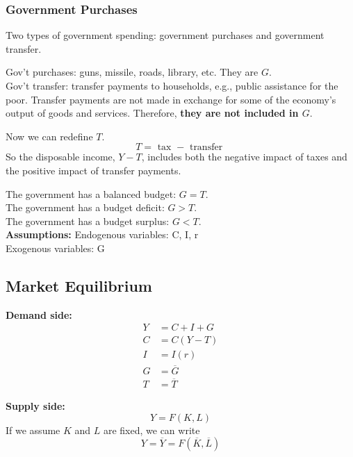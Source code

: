 \documentclass[12pt]{article}
\begin{document}
\subsubsection{Government Purchases}
Two types of government spending: government purchases and government transfer.

Gov't purchases: guns, missile, roads, library, etc. They are $ G $.\\
Gov't transfer: transfer payments to households, e.g., public assistance for the poor.
Transfer payments are not made in exchange for some of the economy's output of goods
and services. Therefore, {\textbf {they are not included in $ G $}}.


Now we can redefine $ T $. 
\begin{equation*}
T = \text{ tax } - \text{ transfer }
\end{equation*}
So the disposable income, $ Y - T $, includes both the negative impact of taxes and 
the positive impact of transfer payments.


The government has a balanced budget: $ G = T $.\\
The government has a budget deficit: $ G > T $.\\
The government has a budget surplus: $ G < T $.\\

{\textbf {Assumptions:}}
Endogenous variables: C, I, r\\
Exogenous variables: G



\subsection{Market Equilibrium}

{\textbf {Demand side:}}
\begin{align*}
Y &= C + I + G\\
C &= C(Y - T)\\
I &= I(r)\\
G &=  \overline{G}\\
T &=  \overline{T}
\end{align*}


{\textbf {Supply side:}}
\begin{equation*}
Y = F(K,L)
\end{equation*}
If we assume $ K $ and $ L $ are fixed, we can write
\begin{equation*}
Y =  \overline{Y} = F( \overline{K},  \overline{L})
\end{equation*}
\end{document}
